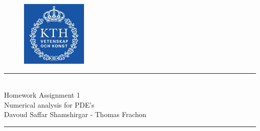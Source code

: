 \documentclass[10pt,a4paper,twoside, french]{article}
\numberwithin{equation}{section}
\numberwithin{figure}{section}
\numberwithin{table}{section}
\begin{document}
\begin{figure}[h]
\centering
\includegraphics[scale=.5]{fig/kth}
\vspace{-1.5cm}
\end{figure}
	\vspace{1cm}    
    \begin{center}
       		\rule{10cm}{1pt} \\[0.6cm]         %
        	{\huge Homework Assignment 1 \\[0.2cm]
         \Large  Numerical analysis for PDE's\\[0.2cm] 
          \large Davoud Saffar Shamshirgar - Thomas Frachon}  \\[0.6cm]
    		\rule{10cm}{1pt} \\[0.5cm]  
	\end{center}    
	
\end{document}
